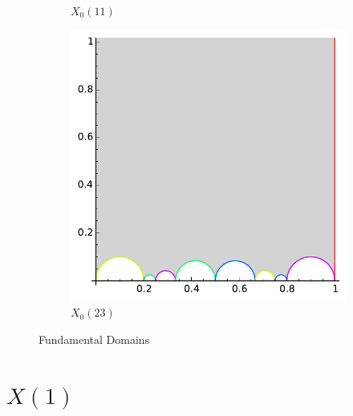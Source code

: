 \documentclass[11pt]{article}
\theoremstyle{plain}
\theoremstyle{remark}
\begin{document}
\begin{figure}
\begin{subfigure}{.5\linewidth}
	\caption{$X_0(11)$\label{X0_11.svg}}
	\end{subfigure}
	\begin{subfigure}{.5\linewidth}
	\centering
	\includegraphics[width=1\linewidth]{X0_23.pdf}
	\caption{$X_0(23)$\label{X0_23.svg}}
	\end{subfigure}
	\caption{Fundamental Domains}\label{fund_domains}
\end{figure}



\section{$X(1)$}
\end{document}
